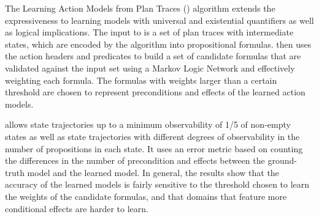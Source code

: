 The Learning Action Models from Plan Traces (\textbf{\LAMP}) \cite{ZhuoYHL10} algorithm extends the expressiveness to learning models with universal and existential quantifiers as well as logical implications. The input to \LAMP is a set of plan traces with intermediate states, which are encoded by the algorithm into propositional formulas. \LAMP then uses the action headers and predicates to build a set of candidate formulas that are validated against the input set using a Markov Logic Network and effectively weighting each formula. The formulas with weights larger than a certain threshold are chosen to represent preconditions and effects of the learned action models.

\LAMP allows \PO state trajectories up to a minimum observability of 1/5 of non-empty states as well as \POstar state trajectories with different degrees of observability in the number of propositions in each state. It uses an error metric based on counting the differences in the number of precondition and effects between the ground-truth model and the learned model. In general, the results show that the accuracy of the learned models is fairly sensitive to the threshold chosen to learn the weights of the candidate formulas, and that domains that feature more conditional effects are harder to learn.


